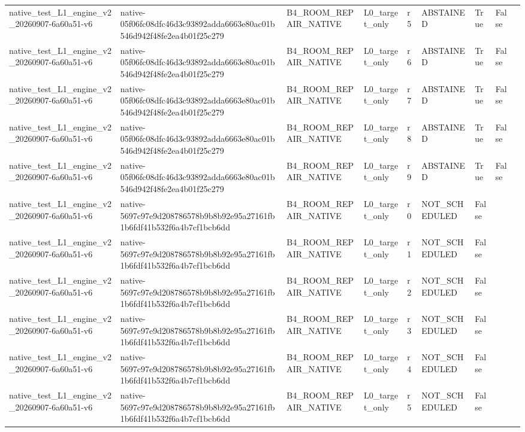 \begin{tabular}{lllllllll}
native\_test\_L1\_engine\_v2\_20260907-6a60a51-v6 & native-05f06fc08dfc46d3c93892adda6663e80ac01b546d942f48fe2ea4b01f25c279 & B4\_ROOM\_REPAIR\_NATIVE & L0\_target\_only & r5 & ABSTAINED & True & False &  \\
native\_test\_L1\_engine\_v2\_20260907-6a60a51-v6 & native-05f06fc08dfc46d3c93892adda6663e80ac01b546d942f48fe2ea4b01f25c279 & B4\_ROOM\_REPAIR\_NATIVE & L0\_target\_only & r6 & ABSTAINED & True & False &  \\
native\_test\_L1\_engine\_v2\_20260907-6a60a51-v6 & native-05f06fc08dfc46d3c93892adda6663e80ac01b546d942f48fe2ea4b01f25c279 & B4\_ROOM\_REPAIR\_NATIVE & L0\_target\_only & r7 & ABSTAINED & True & False &  \\
native\_test\_L1\_engine\_v2\_20260907-6a60a51-v6 & native-05f06fc08dfc46d3c93892adda6663e80ac01b546d942f48fe2ea4b01f25c279 & B4\_ROOM\_REPAIR\_NATIVE & L0\_target\_only & r8 & ABSTAINED & True & False &  \\
native\_test\_L1\_engine\_v2\_20260907-6a60a51-v6 & native-05f06fc08dfc46d3c93892adda6663e80ac01b546d942f48fe2ea4b01f25c279 & B4\_ROOM\_REPAIR\_NATIVE & L0\_target\_only & r9 & ABSTAINED & True & False &  \\
native\_test\_L1\_engine\_v2\_20260907-6a60a51-v6 & native-5697c97e9d208786578b9b8b92e95a27161fb1b6fdf41b532f6a4b7cf1bcb6dd & B4\_ROOM\_REPAIR\_NATIVE & L0\_target\_only & r0 & NOT\_SCHEDULED & False &  &  \\
native\_test\_L1\_engine\_v2\_20260907-6a60a51-v6 & native-5697c97e9d208786578b9b8b92e95a27161fb1b6fdf41b532f6a4b7cf1bcb6dd & B4\_ROOM\_REPAIR\_NATIVE & L0\_target\_only & r1 & NOT\_SCHEDULED & False &  &  \\
native\_test\_L1\_engine\_v2\_20260907-6a60a51-v6 & native-5697c97e9d208786578b9b8b92e95a27161fb1b6fdf41b532f6a4b7cf1bcb6dd & B4\_ROOM\_REPAIR\_NATIVE & L0\_target\_only & r2 & NOT\_SCHEDULED & False &  &  \\
native\_test\_L1\_engine\_v2\_20260907-6a60a51-v6 & native-5697c97e9d208786578b9b8b92e95a27161fb1b6fdf41b532f6a4b7cf1bcb6dd & B4\_ROOM\_REPAIR\_NATIVE & L0\_target\_only & r3 & NOT\_SCHEDULED & False &  &  \\
native\_test\_L1\_engine\_v2\_20260907-6a60a51-v6 & native-5697c97e9d208786578b9b8b92e95a27161fb1b6fdf41b532f6a4b7cf1bcb6dd & B4\_ROOM\_REPAIR\_NATIVE & L0\_target\_only & r4 & NOT\_SCHEDULED & False &  &  \\
native\_test\_L1\_engine\_v2\_20260907-6a60a51-v6 & native-5697c97e9d208786578b9b8b92e95a27161fb1b6fdf41b532f6a4b7cf1bcb6dd & B4\_ROOM\_REPAIR\_NATIVE & L0\_target\_only & r5 & NOT\_SCHEDULED & False &  &  \\

\end{tabular}
